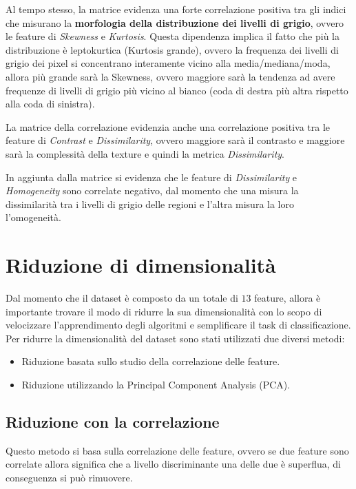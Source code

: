 Al tempo stesso, la matrice evidenza una forte correlazione positiva tra gli 
indici che misurano la \textbf{morfologia della distribuzione dei livelli
      di grigio}, ovvero le feature di \textit{Skewness} e \textit{Kurtosis}.
Questa dipendenza implica il fatto che più la distribuzione è leptokurtica
(Kurtosis grande), ovvero la frequenza dei livelli di grigio dei pixel si
concentrano interamente vicino alla media/mediana/moda, allora più grande sarà
la Skewness, ovvero maggiore sarà la tendenza ad avere frequenze di livelli di
grigio più vicino al bianco (coda di destra più altra rispetto alla coda di
sinistra).

La matrice della correlazione evidenzia anche una correlazione positiva tra le
feature di \textit{Contrast} e \textit{Dissimilarity}, ovvero maggiore sarà il
contrasto e maggiore sarà la complessità della texture e quindi la metrica
\textit{Dissimilarity}.

In aggiunta dalla matrice si evidenza che le feature di \textit{Dissimilarity}
e \textit{Homogeneity} sono correlate negativo, dal momento che una misura la
dissimilarità tra i livelli di grigio delle regioni e l'altra misura la loro
l'omogeneità.
\section{Riduzione di dimensionalità} \label{sec:riduzone_di_dimensionalità}
Dal momento che il dataset è composto da un totale di $13$ feature, allora
è importante trovare il modo di ridurre la sua dimensionalità con lo scopo di
velocizzare l'apprendimento degli algoritmi e semplificare il task di classificazione.
Per ridurre la dimensionalità del dataset sono stati utilizzati due diversi metodi:
\begin{itemize}
      \item Riduzione basata sullo studio della correlazione delle feature.
      \item Riduzione utilizzando la Principal Component Analysis (PCA).
\end{itemize}
\subsection{Riduzione con la correlazione} \label{sec:riduzione_correlazione}
Questo metodo si basa sulla correlazione delle feature, ovvero se due feature
sono correlate allora significa che a livello discriminante una delle due è
superflua, di conseguenza si può rimuovere.

